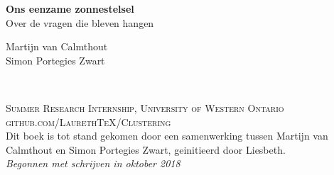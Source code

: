\documentclass[11pt,fleqn]{book} %
\begin{document}

\begingroup
\thispagestyle{empty}
\centering
\vspace*{5cm}
\par\normalfont\fontsize{35}{35}\sffamily\selectfont
\textbf{Ons eenzame zonnestelsel}\\
{\LARGE Over de vragen die bleven hangen}\par %
\vspace*{1cm}
{\Huge Martijn van Calmthout \\
       Simon Portegies Zwart}\par %
\endgroup


\newpage
~\vfill
\thispagestyle{empty}


\noindent \textsc{Summer Research Internship, University of Western Ontario}\\

\noindent \textsc{github.com/LaurethTeX/Clustering}\\ %

\noindent Dit boek is tot stand gekomen door een samenwerking tussen Martijn van Calmthout en Simon Portegies Zwart, geinitieerd door Liesbeth.\\ %

\noindent \textit{Begonnen met schrijven in oktober 2018} %



\pagestyle{empty} %

\tableofcontents %
\end{document}

